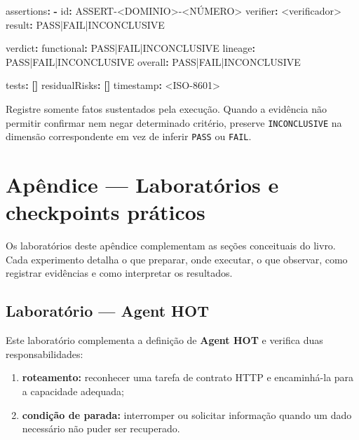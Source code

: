 \documentclass[
  10pt,
  a4paper,
  oneside]{book}
\newenvironment{Shaded}{}{}
\newcommand{\AttributeTok}[1]{\textcolor[rgb]{0.49,0.56,0.16}{#1}}
\newcommand{\FunctionTok}[1]{\textcolor[rgb]{0.02,0.16,0.49}{#1}}
\newcommand{\KeywordTok}[1]{\textcolor[rgb]{0.00,0.44,0.13}{\textbf{#1}}}
\providecommand{\tightlist}{%
  \setlength{\itemsep}{0pt}\setlength{\parskip}{0pt}}
\renewenvironment{Shaded}{\begin{snugshade}}{\end{snugshade}}%
\begin{document}
\begin{Shaded}
\begin{Highlighting}[]
\AttributeTok{  }\FunctionTok{assertions}\KeywordTok{:}
\AttributeTok{    }\KeywordTok{{-}}\AttributeTok{ }\FunctionTok{id}\KeywordTok{:}\AttributeTok{ ASSERT{-}\textless{}DOMINIO\textgreater{}{-}\textless{}NÚMERO\textgreater{}}
\AttributeTok{      }\FunctionTok{verifier}\KeywordTok{:}\AttributeTok{ \textless{}verificador\textgreater{}}
\AttributeTok{      }\FunctionTok{result}\KeywordTok{:}\AttributeTok{ PASS|FAIL|INCONCLUSIVE}

\FunctionTok{verdict}\KeywordTok{:}
\AttributeTok{  }\FunctionTok{functional}\KeywordTok{:}\AttributeTok{ PASS|FAIL|INCONCLUSIVE}
\AttributeTok{  }\FunctionTok{lineage}\KeywordTok{:}\AttributeTok{ PASS|FAIL|INCONCLUSIVE}
\AttributeTok{  }\FunctionTok{overall}\KeywordTok{:}\AttributeTok{ PASS|FAIL|INCONCLUSIVE}

\FunctionTok{tests}\KeywordTok{:}\AttributeTok{ }\KeywordTok{[]}
\FunctionTok{residualRisks}\KeywordTok{:}\AttributeTok{ }\KeywordTok{[]}
\FunctionTok{timestamp}\KeywordTok{:}\AttributeTok{ \textless{}ISO{-}8601\textgreater{}}
\end{Highlighting}
\end{Shaded}

Registre somente fatos sustentados pela execução. Quando a evidência não
permitir confirmar nem negar determinado critério, preserve
\texttt{INCONCLUSIVE} na dimensão correspondente em vez de inferir
\texttt{PASS} ou \texttt{FAIL}.

\hypertarget{apuxeandice-laboratuxf3rios-e-checkpoints-pruxe1ticos}{%
\chapter{Apêndice --- Laboratórios e checkpoints
práticos}\label{apuxeandice-laboratuxf3rios-e-checkpoints-pruxe1ticos}}

Os laboratórios deste apêndice complementam as seções conceituais do
livro. Cada experimento detalha o que preparar, onde executar, o que
observar, como registrar evidências e como interpretar os resultados.

\hypertarget{laboratorio-agent-hot}{%
\section{Laboratório --- Agent HOT}\label{laboratorio-agent-hot}}

Este laboratório complementa a definição de \textbf{Agent HOT} e
verifica duas responsabilidades:

\begin{enumerate}
\def\labelenumi{\arabic{enumi}.}
\tightlist
\item
  \textbf{roteamento:} reconhecer uma tarefa de contrato HTTP e
  encaminhá-la para a capacidade adequada;
\item
  \textbf{condição de parada:} interromper ou solicitar informação
  quando um dado necessário não puder ser recuperado.
\end{enumerate}
\end{document}
